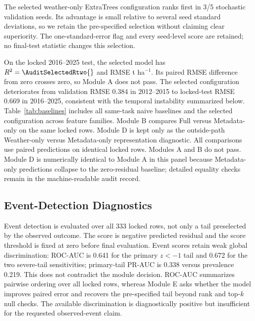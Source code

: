 \documentclass[conference]{IEEEtran}
\begin{document}
The selected weather-only ExtraTrees configuration ranks first in 3/5 stochastic
validation seeds. Its advantage is small relative to several seed standard
deviations, so we retain the pre-specified selection without claiming clear
superiority. The one-standard-error flag and every seed-level
score are retained; no final-test statistic changes this selection.

On the locked 2016--2025 test, the selected model has
$R^2=\AuditSelectedRtwo{}$ and RMSE
\AuditSelectedRMSE{} t ha$^{-1}$. Its paired RMSE difference from zero crosses
zero, so Module A does not pass. The selected configuration deteriorates from validation
RMSE 0.384 in 2012--2015 to locked-test RMSE 0.669 in 2016--2025, consistent with
the temporal instability summarized below. Table~\ref{tab:baselines} includes all
same-task naive baselines and the selected configuration across feature families.
Module B compares Full versus Metadata-only on the same locked rows. Module D is
kept only as the outside-path Weather-only versus Metadata-only representation
diagnostic. All comparisons use paired predictions on identical locked rows.
Modules A and B do not pass. Module D is numerically identical to Module A in
this panel because Metadata-only predictions collapse to the zero-residual
baseline; detailed equality checks remain in the machine-readable audit record.

\begin{table}[t]
\centering
\caption{Locked 2016--2025 same-task audit. Learned-model predictions are seed
aggregated. $\Delta$RMSE is model minus zero-residual RMSE with paired 95\%
year-block intervals; RMSE is t ha$^{-1}$. The Module B contrast is computed
directly as Full-minus-Metadata; in this panel it matches Full-minus-zero
because Metadata-only predictions coincide with the zero-residual vector to
floating-point precision.}
\label{tab:baselines}
\scriptsize
\resizebox{\textwidth}{!}{}
\end{table}

\subsection{Event-Detection Diagnostics}
Event detection is evaluated over all 333 locked rows, not only a tail preselected
by the observed outcome. The score is negative predicted residual and the score
threshold is fixed at zero before final evaluation. Event scores retain weak
global discrimination: ROC-AUC is 0.641 for the primary $z<-1$ tail and 0.672 for
the two severe-tail sensitivities; primary-tail PR-AUC is 0.338 versus prevalence
0.219. This does not contradict the module decision. ROC-AUC summarizes pairwise
ordering over all locked rows, whereas Module E asks whether the model improves
paired error and recovers the pre-specified tail beyond rank and top-$k$ null
checks. The available discrimination is diagnostically positive but insufficient
for the requested observed-event claim.
\end{document}
